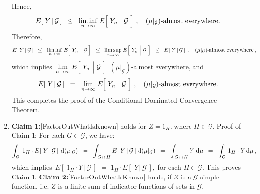 \begin{enumerate}
	Hence,
	\begin{equation*}
	E\!\left[\;Y\,\vert\,\mathcal{G}\,\right]
	\;\; \leq \;\;
		\underset{n\rightarrow\infty}{\liminf}\;E\!\left[\;
			Y_{n}\,\left\vert\;\overset{{\color{white}.}}{\mathcal{G}}\right.
			\,\right]\,,
	\quad
	\textnormal{$(\mu\vert_{\mathcal{G}})$-almost everywhere}.
	\end{equation*}
	Therefore,
	\begin{equation*}
	E\!\left[\;Y\,\vert\,\mathcal{G}\,\right]
	\;\; \leq \;\;
		\underset{n\rightarrow\infty}{\liminf}\;E\!\left[\;
			Y_{n}\,\left\vert\;\overset{{\color{white}.}}{\mathcal{G}}\right.
			\,\right]
	\;\; \leq \;\;
		\underset{n\rightarrow\infty}{\limsup}\;E\!\left[\;
			Y_{n}\,\left\vert\;\overset{{\color{white}.}}{\mathcal{G}}\right.
			\,\right]
	\;\; \leq \;\;
	E\!\left[\;Y\,\vert\,\mathcal{G}\,\right]\,,
	\quad
	\textnormal{$(\mu\vert_{\mathcal{G}})$-almost everywhere}\,,
	\end{equation*}
	which implies
	\,$\underset{n\rightarrow\infty}{\lim}\;E\!\left[\;Y_{n}\,\left\vert\;\overset{{\color{white}.}}{\mathcal{G}}\right.\,\right]$\,
	$(\mu\vert_{\mathcal{G}})$-almost everywhere, and
	\begin{equation*}
	E\!\left[\;Y\,\vert\,\mathcal{G}\,\right]
	\;\; = \;\;
		\underset{n\rightarrow\infty}{\lim}\;E\!\left[\;
			Y_{n}\,\left\vert\;\overset{{\color{white}.}}{\mathcal{G}}\right.
			\,\right]\,,
	\quad
	\textnormal{$(\mu\vert_{\mathcal{G}})$-almost everywhere}.
	\end{equation*}
	This completes the proof of the Conditional Dominated Convergence Theorem.
\item
	\textbf{Claim 1:}\;\;\eqref{FactorOutWhatIsKnown} holds for $Z = 1_{H}$, where $H \in \mathcal{G}$.
	\vskip 0.0cm
	Proof of Claim 1: For each $G \in \mathcal{G}$, we have:
	\begin{equation*}
	\int_{G}\;1_{H} \cdot E\!\left[\;Y\,\vert\,\mathcal{G}\,\right]\,\textnormal{d}(\mu\vert_{\mathcal{G}})
	\;\; = \;\;
	\int_{\,G\,\cap\,H}E\!\left[\;Y\,\vert\,\mathcal{G}\,\right]\,\textnormal{d}(\mu\vert_{\mathcal{G}})
	\;\; = \;\;
	\int_{\,G\,\cap\,H} Y\;\textnormal{d}\mu
	\;\; = \;\;
	\int_{G}\,1_{H} \cdot Y\,\textnormal{d}\mu\,,
	\end{equation*}
	which implies \,$E\!\left[\;1_{H}\cdot Y\,\vert\,\mathcal{G}\,\right]$
	$=$ $1_{H}\cdot E\!\left[\;Y\,\vert\,\mathcal{G}\,\right]$,\,
	for each $H \in \mathcal{G}$.
	This proves Claim 1.
	\vskip 0.4cm
	\textbf{Claim 2:}\;\;\eqref{FactorOutWhatIsKnown} holds, if $Z$ is a $\mathcal{G}$-simple function,
	i.e. $Z$ is a finite sum of indicator functions of sets in $\mathcal{G}$.

\end{enumerate}
